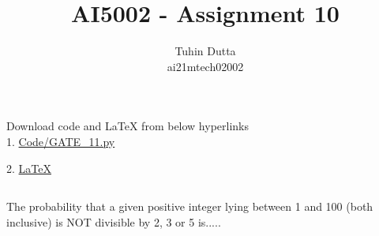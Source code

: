 \documentclass[journal,12pt,twocolumn]{IEEEtran}
\begin{document}
\providecommand{\mtx}[1]{\mathbf{#1}}
\providecommand{\fourier}{\overset{\mathcal{F}}{ \rightleftharpoons}}
\providecommand{\system}{\overset{\mathcal{H}}{ \longleftrightarrow}}
\newcommand{\solution}{\noindent \textbf{Solution: }}
\newcommand{\cosec}{\,\text{cosec}\,}
\providecommand{\dec}[2]{\ensuremath{\overset{#1}{\underset{#2}{\gtrless}}}}
\newcommand{\myvec}[1]{\ensuremath{\begin{pmatrix}#1\end{pmatrix}}}
\newcommand{\mydet}[1]{\ensuremath{\begin{vmatrix}#1\end{vmatrix}}}
\makeatletter
{}
\makeatother
\let\StandardTheFigure\thefigure
\let\vec\mathbf
\renewcommand{\thefigure}{\theproblem}
\def\putbox#1#2#3{\makebox[0in][l]{\makebox[#1][l]{}\raisebox{\baselineskip}[0in][0in]{\raisebox{#2}[0in][0in]{#3}}}}
     \def\rightbox#1{\makebox[0in][r]{#1}}
     \def\centbox#1{\makebox[0in]{#1}}
     \def\topbox#1{\raisebox{-\baselineskip}[0in][0in]{#1}}
     \def\midbox#1{\raisebox{-0.5\baselineskip}[0in][0in]{#1}}
\vspace{3cm}
\title{AI5002 - Assignment 10}
\author{Tuhin Dutta\\ ai21mtech02002}
\maketitle
\newpage
\bigskip
\renewcommand{\thefigure}{\theenumi}
\renewcommand{\thetable}{\theenumi}
\begin{mdframed}
Download code and LaTeX from below hyperlinks\\
1. \href{https://github.com/Tauhait/AI5002/blob/main/Assignment-10/Code/GATE\_11.py}{Code/GATE\_11.py}


2. \href{https://github.com/Tauhait/AI5002/tree/main/Assignment-10/LaTeX}{LaTeX}
\end{mdframed}
\subsection*{}
The probability that a given positive integer
lying between 1 and 100 (both inclusive) is
NOT divisible by 2, 3 or 5 is.....
\end{document}

